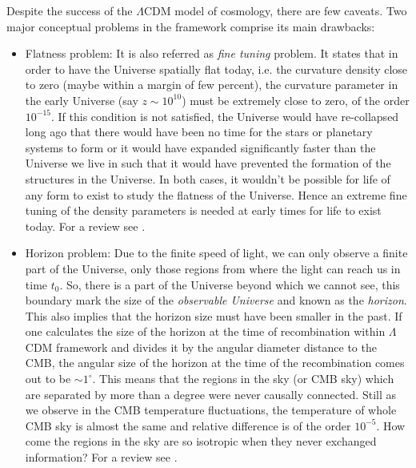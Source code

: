 \documentclass[
  11pt,
  twoside,
  openright,
  titlepage,
  headings=optiontoheadandtoc
]{scrbook}
\begin{document}
Despite the success of the $\Lambda$CDM model of cosmology, there are few caveats.
Two major conceptual problems in the framework comprise its main drawbacks:

\begin{itemize}
	\item Flatness problem: It is also referred as {\it fine tuning} problem. It 
				states that in order to have the Universe spatially flat today, i.e.
				the curvature density close to zero (maybe within a margin of
				few percent), the curvature parameter in the early Universe (say 
				$z\sim10^{10}$) must be extremely close to zero, of the order $10^{-15}$.
				If this condition is not satisfied, the Universe would have re-collapsed
				long ago that there would have been no time for the stars or 
				planetary systems to form
				or it would have expanded significantly faster than the Universe
				we live in such that it would have prevented the formation of the structures
				in the Universe. In both cases, it wouldn't be possible for life
				of any form to exist to study the flatness of the Universe. Hence
				an extreme fine tuning of the density parameters is needed at early
				times for life to exist today. For a review see \cite{2012PASA...29..395K}.

	\item Horizon problem: Due to the finite speed of light, we can only observe
				a finite part of the Universe, 
				only those regions from where the light can reach us
				in time $t_0$. So, there is a part of the Universe beyond which
				we cannot see, this boundary mark the size of the {\it observable Universe}
				and known as the {\it horizon}. This also implies that the horizon
				size must have been smaller in the past. If one calculates the size of the
				horizon at the time of recombination within $\Lambda$CDM framework and
				divides it by the angular diameter distance to the CMB, the angular
				size of the horizon at the time of the recombination 
				comes out to be $\sim 1^{\circ}$. This means
				that the regions in the sky (or CMB sky) which are separated by 
				more than a degree were never causally connected. Still as
				we observe in the CMB temperature fluctuations, the temperature of
				whole CMB sky is almost the same and relative difference is of the 
				order $10^{-5}$. How come the regions in the sky are so isotropic
				when they never exchanged information? For a review see 
				\cite{2012PASA...29..395K}.
\end{itemize}
\end{document}
